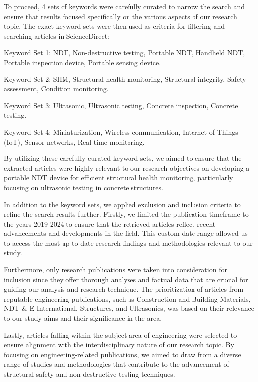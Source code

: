 \documentclass[journal, a4paper]{IEEEtran}
\begin{document}
To proceed, 4 sets of keywords were carefully curated to narrow the search and ensure that results focused specifically on the various aspects of our research topic. The exact keyword sets were then used as criteria for filtering and searching articles in ScienceDirect:

    Keyword Set 1: NDT, Non-destructive testing, Portable NDT, Handheld NDT, Portable inspection device, Portable sensing device.

    Keyword Set 2: SHM, Structural health monitoring, Structural integrity, Safety assessment, Condition monitoring.

    Keyword Set 3: Ultrasonic, Ultrasonic testing, Concrete inspection, Concrete testing.

    Keyword Set 4: Miniaturization, Wireless communication, Internet of Things (IoT), Sensor networks, Real-time monitoring.

By utilizing these carefully curated keyword sets, we aimed to ensure that the extracted articles were highly relevant to our research objectives on developing a portable NDT device for efficient structural health monitoring, particularly focusing on ultrasonic testing in concrete structures. 

In addition to the keyword sets, we applied exclusion and inclusion criteria to refine the search results further. Firstly, we limited the publication timeframe to the years 2019-2024 to ensure that the retrieved articles reflect recent advancements and developments in the field. This custom date range allowed us to access the most up-to-date research findings and methodologies relevant to our study.

Furthermore, only research publications were taken into consideration for inclusion since they offer thorough analyses and factual data that are crucial for guiding our analysis and research technique. The prioritization of articles from reputable engineering publications, such as Construction and Building Materials, NDT & E International, Structures, and Ultrasonics, was based on their relevance to our study aims and their significance in the area.

Lastly, articles falling within the subject area of engineering were selected to ensure alignment with the interdisciplinary nature of our research topic. By focusing on engineering-related publications, we aimed to draw from a diverse range of studies and methodologies that contribute to the advancement of structural safety and non-destructive testing techniques.
\end{document}
